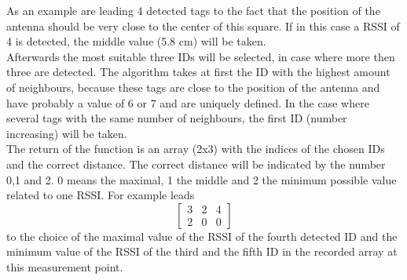 As an example are leading 4 detected tags to the fact that the position of the antenna should be very close to the center of this square. If in this case a RSSI of 4 is detected, the middle value (5.8 cm) will be taken. \\
Afterwards the most suitable three IDs will be selected, in case where more then three are detected. The algorithm takes at first the ID with the highest amount of neighbours, because these tags are close to the position of the antenna and have probably a value of 6 or 7 and are uniquely defined. In the case where several tags with the same number of neighbours, the first ID (number increasing) will be taken. \\
The return of the function is an array (2x3) with the indices of the chosen IDs and the correct distance. The correct distance will be indicated by the number 0,1 and 2. 0 means the maximal, 1 the middle and 2 the minimum possible value related to one RSSI. For example leads 
\[
\begin{bmatrix}
    3 & 2 & 4\\
    2 & 0 & 0 
\end{bmatrix} 
\]
to the choice of the maximal value of the RSSI of the fourth detected ID and the minimum value of the RSSI of the third and the fifth ID in the recorded array at this measurement point. \\

